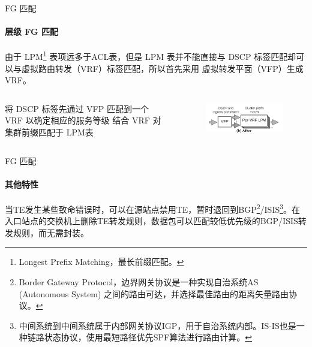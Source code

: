 \begin{frame}{FG 匹配}
    \framesubtitle{层级 FG 匹配}
    由于 LPM\footnote{Longest Prefix Matching，最长前缀匹配。} 表项远多于ACL表，但是 LPM 表并不能直接与 DSCP 标签匹配却可以与虚拟路由转发（VRF）标签匹配，所以首先采用 虚拟转发平面（VFP）生成VRF。
    \begin{columns}
        \begin{column}{0.6\textwidth}
            \begin{algorithm}[H]
                \caption{层级 FG 匹配}\label{alg:fgmatch}
                将 DSCP 标签先通过 VFP 匹配到一个 VRF 以确定相应的服务等级\;
                结合 VRF 对集群前缀匹配于 LPM表\;
            \end{algorithm}
        \end{column}
        \begin{column}{0.4\textwidth}
            \begin{figure}
                \centering
                \includegraphics[width=\linewidth]{img/FG3.png}
            \end{figure}
        \end{column}
    \end{columns}

\end{frame}

\begin{frame}{FG 匹配}
    \framesubtitle{其他特性}
    当TE发生某些致命错误时，可以在源站点禁用TE，暂时退回到BGP\footnote{Border Gateway Protocol，边界网关协议是一种实现自治系统AS (Autonomous System) 之间的路由可达，并选择最佳路由的距离矢量路由协议。}/ISIS\footnote{中间系统到中间系统属于内部网关协议IGP，用于自治系统内部。IS-IS也是一种链路状态协议，使用最短路径优先SPF算法进行路由计算。}。在入口站点的交换机上删除TE转发规则，数据包可以匹配较低优先级的BGP/ISIS转发规则，而无需封装。
\end{frame}

